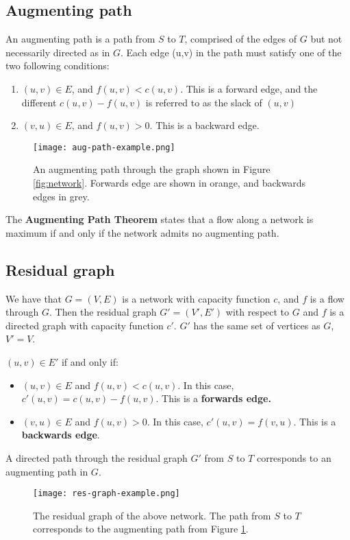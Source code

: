 \documentclass{l4proj}
\begin{document}
\subsection{Augmenting path}
An augmenting path is a path from $S$ to $T$, comprised of the edges of $G$ but not necessarily directed as in $G$. Each edge (u,v) in the path must satisfy one of the two following conditions:

\begin{enumerate}
    \item $(u,v) \in E$, and $f(u,v) < c(u,v)$. This is a forward edge, and the different $c(u,v) - f(u,v)$ is referred to as the slack of $(u,v)$
    \item $(v,u) \in E$, and $f(u,v) > 0$. This is a backward edge.
\end{enumerate}

\begin{figure}[h]
    \centering
    \texttt{[image: aug-path-example.png]}
    \caption{An augmenting path through the graph shown in Figure \ref{fig:network}. Forwards edge are shown in orange, and backwards edges in grey.}
    \label{fig:aug-path}
\end{figure}

The \textbf{Augmenting Path Theorem} states that a flow along a network is maximum if and only if the network admits no augmenting path.

\subsection{Residual graph}
We have that $G=(V,E)$ is a network with capacity function $c$, and $f$ is a flow through $G$. Then the residual graph $G'=(V',E')$ with respect to $G$ and $f$ is a directed graph with capacity function $c'$. $G'$ has the same set of vertices as $G$, $V'=V$.

$(u,v) \in E'$ if and only if:
\begin{itemize}
    \item $(u,v) \in E$ and $f(u,v)<c(u,v)$. In this case, $c'(u,v) = c(u,v) - f(u,v)$. This is a \textbf{forwards edge.}
    \item $(v,u) \in E$ and $f(u,v)>0$. In this case, $c'(u,v) = f(v,u)$. This is a \textbf{backwards edge}.
\end{itemize}

A directed path through the residual graph $G'$ from $S$ to $T$ corresponds to an augmenting path in $G$.

\begin{figure}[h]
    \centering
    \texttt{[image: res-graph-example.png]}
    \caption{The residual graph of the above network. The path from $S$ to $T$ corresponds to the augmenting path from Figure \ref{fig:aug-path}.}
    \label{fig:my_label}
\end{figure}
\end{document}
